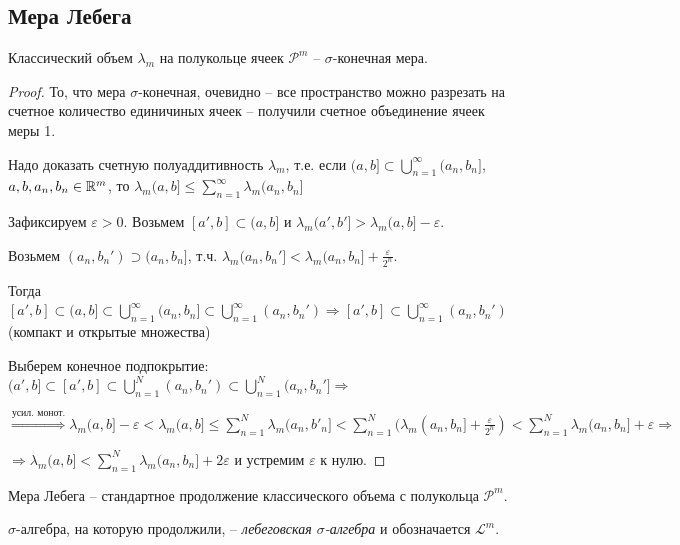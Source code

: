 \subsection{Мера Лебега}

\begin{theorem}
    Классический объем $\lambda_m$ на полукольце ячеек $\mathcal{P}^m$ – 
    $\sigma$-конечная мера.
\end{theorem}

\begin{proof}
    То, что мера $\sigma$-конечная, очевидно – все пространство можно разрезать на счетное количество единичиных ячеек –
    получили счетное объединение ячеек меры 1.

    Надо доказать счетную полуаддитивность $\lambda_m$, т.е. если 
    $(a, b]\subset \bigcup\limits_{n=1}^\infty (a_n, b_n]$, $a, b, a_n, b_n\in \mathbb{R}^m$, то 
    $\lambda_m (a, b]\leq \sum\limits_{n=1}^\infty \lambda_m (a_n, b_n]$

    Зафиксируем $\varepsilon > 0$. Возьмем $[a', b]\subset (a, b]$ и $\lambda_m (a', b']>\lambda_m (a, b]-\varepsilon$.

    Возьмем $(a_n, b_n')\supset (a_n, b_n]$, т.ч. $\lambda_m (a_n, b_n']<\lambda_m (a_n, b_n]+\frac{\varepsilon}{2^n}$.

    Тогда $[a', b]\subset (a, b]\subset \bigcup\limits_{n=1}^\infty (a_n, b_n] \subset \bigcup\limits_{n=1}^\infty (a_n, b_n')
    \Rightarrow[a', b]\subset\bigcup\limits_{n=1}^\infty (a_n, b_n')$ (компакт и открытые множества)

    Выберем конечное подпокрытие: $(a', b]\subset [a', b]\subset\bigcup\limits_{n=1}^N (a_n, b_n')\subset\bigcup\limits_{n=1}^N (a_n, b_n']\Rightarrow$

    $\overset{\text{усил. монот.}}{\Rightarrow} \lambda_m(a, b]- \varepsilon < \lambda_m(a, b]
    \leq \sum\limits_{n=1}^N\lambda_m (a_n, b'_n]< \sum\limits_{n=1}^N(\lambda_m (a_n, b_n] + \frac{\varepsilon}{2^n})<
    \sum\limits_{n=1}^N\lambda_m (a_n, b_n] + \varepsilon\Rightarrow$

    $\Rightarrow\lambda_m(a, b]< \sum\limits_{n=1}^N\lambda_m (a_n, b_n] + 2\varepsilon$ и устремим $\varepsilon$ к нулю.
\end{proof}

\begin{definition}
    Мера Лебега – стандартное продолжение классического объема с полукольца 
    $\mathcal{P}^m$. 
    
    $\sigma$-алгебра, на которую продолжили, – \textit{лебеговская $\sigma$-алгебра}
    и обозначается $\mathcal{L}^m$.
\end{definition}


